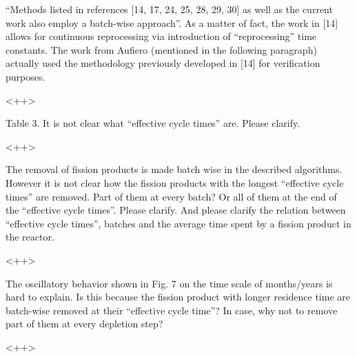 \documentclass[answers,11pt]{exam}
\begin{document}
\begin{questions}
        \question ``Methods listed in references [14, 17, 24, 25, 28, 29, 30] 
        as well as the current work also employ a batch-wise approach''. As a 
        matter of fact, the work in [14]  allows for continuous reprocessing 
        via introduction of ``reprocessing'' time constants. The work from  
        Aufiero (mentioned in the following paragraph) actually used the 
        methodology previously developed in [14]  for verification purposes.
        \begin{solution}
                <++>
        \end{solution}


        \question Table 3. It is not clear what ``effective cycle times'' are. 
        Please clarify.
        \begin{solution}
                <++>
        \end{solution}


        \question The removal of fission products is made batch wise in the 
        described algorithms. However it is not clear how the fission products 
        with the longest ``effective cycle times'' are removed. Part of them at 
        every batch? Or all of them at the end of the  ``effective cycle 
        times''.  Please clarify. And please clarify the relation between 
        ``effective cycle times'', batches and the average time spent by a 
        fission product in the reactor.
        \begin{solution}
                <++>
        \end{solution}


        \question The oscillatory behavior shown in Fig. 7 on the time scale of 
        months/years is hard to explain. Is this because the fission product 
        with longer residence time are batch-wise removed at their ``effective 
        cycle time''? In case, why not to remove part of them at every depletion 
        step?  
        \begin{solution}
                <++>
        \end{solution}



\end{questions}
\end{document}
